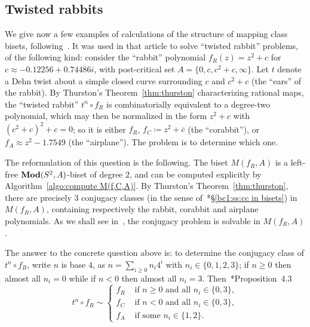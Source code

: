 \documentclass{amsart}
\begin{document}
\subsection{Twisted rabbits}
We give now a few examples of calculations of the structure of mapping
class bisets, following~\cite{bartholdi-n:thurston}. It was used in
that article to solve ``twisted rabbit'' problems, of the following
kind: consider the ``rabbit'' polynomial $f_R(z)=z^2+c$ for
$c\approx-0.12256+0.74486i$, with post-critical set
$A=\{0,c,c^2+c,\infty\}$. Let $t$ denote a Dehn twist about a simple
closed curve surrounding $c$ and $c^2+c$ (the ``ears'' of the
rabbit). By Thurston's Theorem~\ref{thm:thurston} characterizing
rational maps, the ``twisted rabbit'' $t^n\circ f_R$ is
combinatorially equivalent to a degree-two polynomial, which may then
be normalized in the form $z^2+c$ with $(c^2+c)^2+c=0$; so it is
either $f_R$, $f_C\coloneqq z^2+\overline c$ (the ``corabbit''), or
$f_A\approx z^2-1.7549$ (the ``airplane''). The problem is to
determine which one.

The reformulation of this question is the following. The biset
$M(f_R,A)$ is a left-free $\mathbf{\relax Mod}(S^2,A)$-biset of degree $2$, and can be
computed explicitly by Algorithm~\ref{algo:compute M(f,C,A)}. By
Thurston's Theorem~\ref{thm:thurston}, there are precisely $3$
conjugacy classes (in the sense
of~\cite{bartholdi-dudko:bc1}*{\S\ref{bc1:ss:cc in bisets}}) in
$M(f_R,A)$, containing respectively the rabbit, corabbit and airplane
polynomials. As we shall see in~\cite{bartholdi-dudko:bc4}, the
conjugacy problem is solvable in $M(f_R,A)$.

The answer to the concrete question above is: to determine the
conjugacy class of $t^n\circ f_R$, write $n$ is base $4$, as
$n=\sum_{i\ge0}n_i4^i$ with $n_i\in\{0,1,2,3\}$; if $n\ge0$ then
almost all $n_i=0$ while if $n<0$ then almost all
$n_i=3$. Then~\cite{bartholdi-n:thurston}*{Proposition~4.3}
\begin{equation}\label{eq:rabbit}
  t^n\circ f_R\sim\begin{cases}f_R & \text{ if $n\ge0$ and all }n_i\in\{0,3\},\\
    f_C & \text{ if $n<0$ and all }n_i\in\{0,3\},\\
    f_A & \text{ if some }n_i\in\{1,2\}.\end{cases}
\end{equation}
\end{document}
